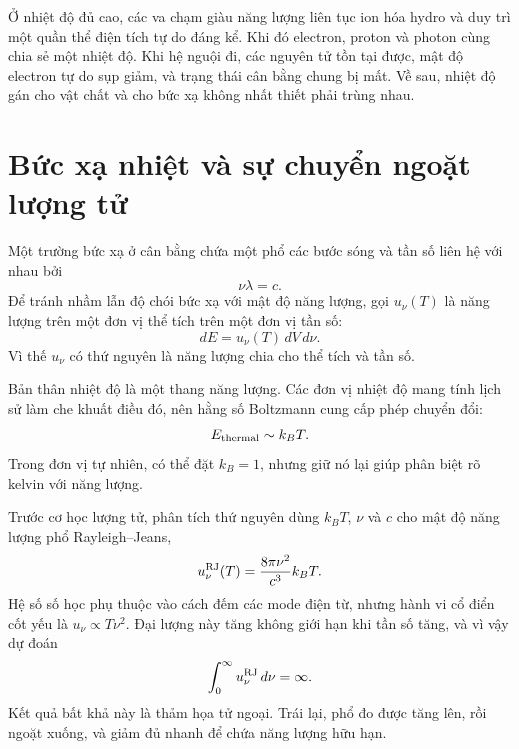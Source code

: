 Ở nhiệt độ đủ cao, các va chạm giàu năng lượng liên tục ion hóa hydro và duy trì một quần thể điện tích tự do đáng kể. Khi đó electron, proton và photon cùng chia sẻ một nhiệt độ. Khi hệ nguội đi, các nguyên tử tồn tại được, mật độ electron tự do sụp giảm, và trạng thái cân bằng chung bị mất. Về sau, nhiệt độ gán cho vật chất và cho bức xạ không nhất thiết phải trùng nhau.

\begin{classroomqa}
\end{classroomqa}

\section{Bức xạ nhiệt và sự chuyển ngoặt lượng tử}

Một trường bức xạ ở cân bằng chứa một phổ các bước sóng và tần số liên hệ với nhau bởi
\begin{equation}
\nu\lambda=c.
\end{equation}
Để tránh nhầm lẫn độ chói bức xạ với mật độ năng lượng, gọi \(u_\nu(T)\) là năng lượng trên một đơn vị thể tích trên một đơn vị tần số:
\begin{equation}
dE=u_\nu(T)\,dV\,d\nu.
\label{eq:c07-spectral-density}
\end{equation}
Vì thế \(u_\nu\) có thứ nguyên là năng lượng chia cho thể tích và tần số.

Bản thân nhiệt độ là một thang năng lượng. Các đơn vị nhiệt độ mang tính lịch sử làm che khuất điều đó, nên hằng số Boltzmann cung cấp phép chuyển đổi:
\begin{equation}
E_{\rm thermal}\sim k_B T.
\end{equation}
Trong đơn vị tự nhiên, có thể đặt \(k_B=1\), nhưng giữ nó lại giúp phân biệt rõ kelvin với năng lượng.

Trước cơ học lượng tử, phân tích thứ nguyên dùng \(k_BT\), \(\nu\) và \(c\) cho mật độ năng lượng phổ Rayleigh--Jeans,
\begin{equation}
u_\nu^{\rm RJ}(T)=\frac{8\pi\nu^2}{c^3}k_BT.
\label{eq:c07-rayleigh-jeans}
\end{equation}
Hệ số số học phụ thuộc vào cách đếm các mode điện từ, nhưng hành vi cổ điển cốt yếu là \(u_\nu\propto T\nu^2\). Đại lượng này tăng không giới hạn khi tần số tăng, và vì vậy dự đoán
\begin{equation}
\int_0^\infty u_\nu^{\rm RJ}\,d\nu=\infty.
\end{equation}
Kết quả bất khả này là thảm họa tử ngoại. Trái lại, phổ đo được tăng lên, rồi ngoặt xuống, và giảm đủ nhanh để chứa năng lượng hữu hạn.

